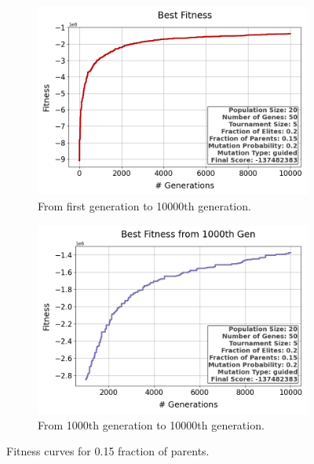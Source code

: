 \documentclass{assignment}
\begin{document}
\begin{figure}[H]
    \begin{subfigure}{0.5\textwidth}
        \includegraphics[width=\textwidth]{figures/best_fitness_output_20_50_5_0.2_0.15_0.2_guided.png}
        \caption{From first generation to 10000th generation.}
    \end{subfigure}\hfill
    \begin{subfigure}{0.5\textwidth}
        \includegraphics[width=\textwidth]{figures/best_fitness_1000_output_20_50_5_0.2_0.15_0.2_guided.png}
        \caption{From 1000th generation to 10000th generation.}
    \end{subfigure}
    \caption{Fitness curves for 0.15 fraction of parents.}
\label{fig:0.15parents}
\end{figure}
\end{document}
